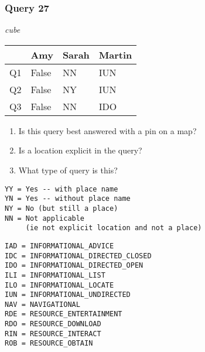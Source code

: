 \begin{frame}[fragile]
\frametitle{Query 27}
\vspace{1em}

\emph{cube}

\vfill

\begin{table}
  \centering
  \begin{tabular}{ l l l l }
    & \textbf{Amy} & \textbf{Sarah} & \textbf{Martin}\\
    \toprule
    Q1 & False & NN & IUN\\
Q2 & False & NY & IUN\\
Q3 & False & NN & IDO\\
    \bottomrule
  \end{tabular}
\end{table}

\vfill

\tiny{

\begin{enumerate}
\item Is this query best answered with a pin on a map?
\item Is a location explicit in the query?
\item What type of query is this?
\end{enumerate}

\vfill

\begin{multicols}{2}
\begin{verbatim}
YY = Yes -- with place name
YN = Yes -- without place name
NY = No (but still a place)
NN = Not applicable 
     (ie not explicit location and not a place)
\end{verbatim}

\columnbreak
\begin{verbatim}
IAD = INFORMATIONAL_ADVICE
IDC = INFORMATIONAL_DIRECTED_CLOSED
IDO = INFORMATIONAL_DIRECTED_OPEN
ILI = INFORMATIONAL_LIST
ILO = INFORMATIONAL_LOCATE
IUN = INFORMATIONAL_UNDIRECTED
NAV = NAVIGATIONAL
RDE = RESOURCE_ENTERTAINMENT
RDO = RESOURCE_DOWNLOAD
RIN = RESOURCE_INTERACT
ROB = RESOURCE_OBTAIN
\end{verbatim}
\end{multicols}
}

\end{frame}


